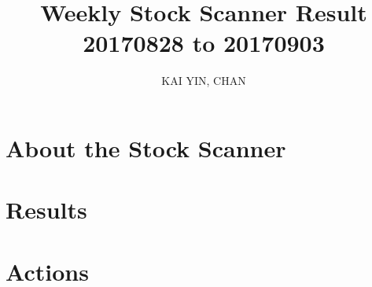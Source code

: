 \documentclass{article}
\begin{document}
\title{Weekly Stock Scanner Result \\ 20170828 to 20170903}
\author{KAI YIN, CHAN}
\maketitle

\section{About the Stock Scanner}

\section{Results}

\section{Actions}
\end{document}
